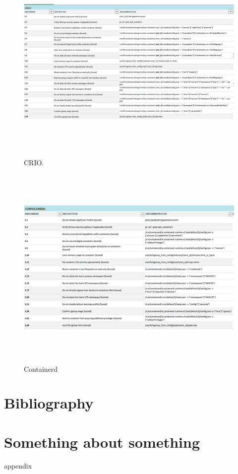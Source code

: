 \documentclass[times, twoside, watermark]{zHenriquesLab-StyleBioRxiv}
\begin{document}
  \begin{figure}
    \caption{CRIO.}
    \centering
      \includegraphics[width=\textwidth,height=10cm]{figures/crio}
  \end{figure}


  \begin{figure}
    \caption{Containerd}
    \centering
      \includegraphics[width=\textwidth,height=10cm]{figures/containerd}
  \end{figure}
\section*{Bibliography}

\onecolumn
\newpage

\captionsetup*{format=largeformat}
\section{Something about something} \label{note:Note1} 
appendix

\end{document}
